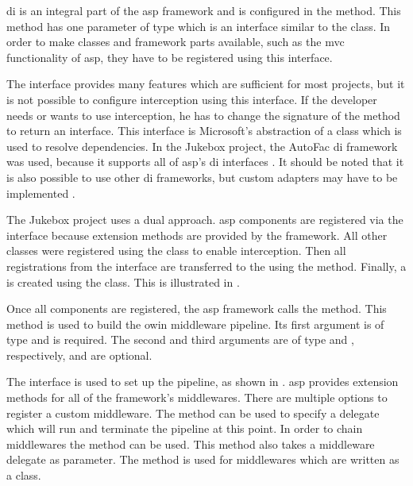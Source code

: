 \gls{di} is an integral part of the \gls{asp} framework and is configured in the  method. This method has one parameter of type  which is an interface similar to the   class. In order to make classes and framework parts available, such as the \gls{mvc} functionality of \gls{asp}, they have to be registered using this interface.

The  interface provides many features which are sufficient for most projects, but it is not possible to configure interception using this interface. If the developer needs or wants to use interception, he has to change the signature of the  method to return an  interface. This interface is Microsoft's abstraction of a  class which is used to resolve dependencies. In the Jukebox project, the AutoFac \gls{di} framework was used, because it supports all of \gls{asp}'s \gls{di} interfaces \cite{autofacCoreDoc}. It should be noted that it is also possible to use other \gls{di} frameworks, but custom adapters may have to be implemented \cite{aspCustomDI}.

The Jukebox project uses a dual approach. \gls{asp} components are registered via the  interface because extension methods are provided by the framework. All other classes were registered using the  class to enable interception. Then all registrations from the  interface are transferred to the  using the  method. Finally, a  is created using the   class. This is illustrated in .


Once all components are registered, the \gls{asp} framework calls the  method. This method is used to build the \gls{owin} middleware pipeline. Its first argument is of type  and is required. The second and third arguments are of type  and , respectively, and are optional.

The  interface is used to set up the pipeline, as shown in . \gls{asp} provides extension methods for all of the framework's middlewares. There are multiple options to register a custom middleware. The  method can be used to specify a delegate which will run and terminate the pipeline at this point. In order to chain middlewares the  method can be used. This method also takes a middleware delegate as parameter. The  method is used for middlewares which are written as a class. \cite{aspMiddleware}


